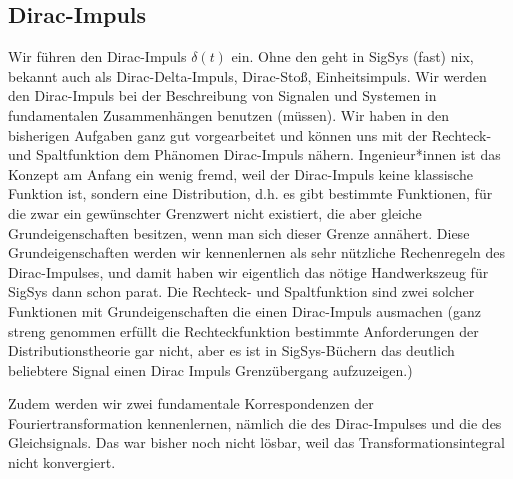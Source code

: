 \newpage
\subsection{Dirac-Impuls}
\label{sec:D410BDAAE0}
\begin{Ziel}
Wir führen den Dirac-Impuls $\delta(t)$ ein.
Ohne den geht in SigSys (fast) nix, bekannt auch als
Dirac-Delta-Impuls, Dirac-Stoß, Einheitsimpuls.
Wir werden den Dirac-Impuls bei der Beschreibung von Signalen und Systemen
in fundamentalen Zusammenhängen benutzen (müssen).
Wir haben in den bisherigen Aufgaben ganz gut vorgearbeitet und können uns
mit der Rechteck- und Spaltfunktion dem Phänomen Dirac-Impuls nähern.
Ingenieur*innen ist das Konzept am Anfang ein wenig fremd, weil
der Dirac-Impuls keine klassische Funktion ist, sondern eine Distribution, d.h.
es gibt bestimmte Funktionen, für die zwar ein gewünschter Grenzwert nicht existiert,
die aber gleiche Grundeigenschaften besitzen, wenn man sich dieser Grenze annähert.
Diese Grundeigenschaften werden wir kennenlernen als sehr nützliche
Rechenregeln des Dirac-Impulses, und damit haben wir eigentlich das nötige
Handwerkszeug für SigSys dann schon parat.
Die Rechteck- und Spaltfunktion sind zwei solcher Funktionen mit
Grundeigenschaften die einen Dirac-Impuls ausmachen (ganz streng genommen erfüllt
die Rechteckfunktion bestimmte Anforderungen der Distributionstheorie gar nicht,
aber es ist in SigSys-Büchern das deutlich beliebtere Signal einen Dirac Impuls
Grenzübergang aufzuzeigen.)

Zudem werden wir zwei fundamentale Korrespondenzen der Fouriertransformation
kennenlernen, nämlich die des Dirac-Impulses und die des Gleichsignals. Das
war bisher noch nicht lösbar, weil das Transformationsintegral nicht konvergiert.
\end{Ziel}
